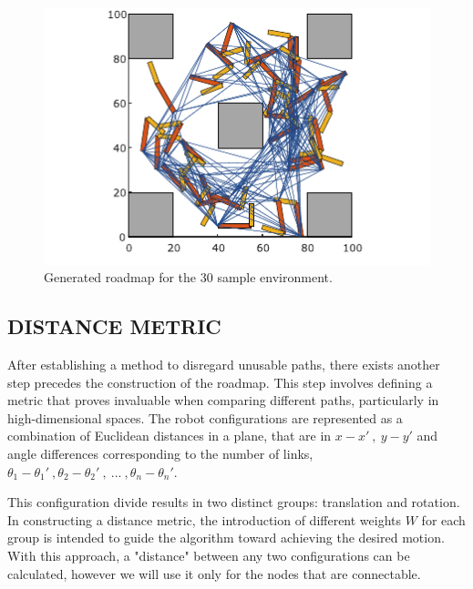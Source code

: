 \documentclass{IEEEtaes}
\begin{document}
\begin{figure}[t]
    \begin{center}
        \includegraphics[width=0.9\linewidth]{figures/ROADMAP.pdf}
     \end{center}
     \vspace{-1.5em}
     \caption{Generated roadmap for the 30 sample environment.}
     \label{roadmap}
    \vspace{-1em}
\end{figure}

\subsection{\fontsize{10}{13}\selectfont DISTANCE METRIC}
After establishing a method to disregard unusable paths, there exists another step precedes the construction of the roadmap. This step involves defining a metric that proves invaluable when comparing different paths, particularly in high-dimensional spaces. The robot configurations are represented as a combination of Euclidean distances in a plane, that are in $x-x'\ ,\ y-y'$ and angle differences corresponding to the number of links, $\theta_1-\theta_1' \ , \theta_2 - \theta_2' \ , \ ... \ , \theta_n - \theta_n'$. 

This configuration divide results in two distinct groups: translation and rotation. In constructing a distance metric, the introduction of different weights $W$ for each group is intended to guide the algorithm toward achieving the desired motion. With this approach, a "distance" between any two configurations can be calculated, however we will use it only for the nodes that are connectable.

\end{document}
